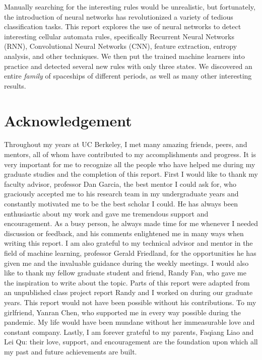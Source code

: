 \documentclass[12pt]{article}
\numberwithin{figure}{section} %
\begin{document}
Manually searching for the interesting rules would be unrealistic, but fortunately, the introduction of neural networks has revolutionized a variety of tedious classification tasks. This report explores the use of neural networks to detect interesting cellular automata rules, specifically Recurrent Neural Networks (RNN), Convolutional Neural Networks (CNN), feature extraction, entropy analysis, and other techniques. We then put the trained machine learners into practice and detected several new rules with only three states. We discovered an entire \textit{family} of spaceships of different periods, as well as many other interesting results. 

\newpage
\thispagestyle{plain}
\section*{\centering Acknowledgement}

Throughout my years at UC Berkeley, I met many amazing friends, peers, and mentors, all of whom have contributed to my accomplishments and progress. It is very important for me to recognize all the people who have helped me during my graduate studies and the completion of this report. First I would like to thank my faculty advisor, professor Dan Garcia, the best mentor I could ask for, who graciously accepted me to his research team in my undergraduate years and constantly motivated me to be the best scholar I could. He has always been enthusiastic about my work and gave me tremendous support and encouragement. As a busy person, he always made time for me whenever I needed discussion or feedback, and his comments enlightened me in many ways when writing this report. I am also grateful to my technical advisor and mentor in the field of machine learning, professor Gerald Friedland, for the opportunities he has given me and the invaluable guidance during the weekly meetings. I would also like to thank my fellow graduate student and friend, Randy Fan, who gave me the inspiration to write about the topic. Parts of this report were adapted from an unpublished class project report Randy and I worked on during our graduate years. This report would not have been possible without his contributions. To my girlfriend, Yanran Chen, who supported me in every way possible during the pandemic. My life would have been mundane without her immeasurable love and constant company. Lastly, I am forever grateful to my parents, Faqiang Liao and Lei Qu: their love, support, and encouragement are the foundation upon which all my past and future achievements are built. 
\end{document}
